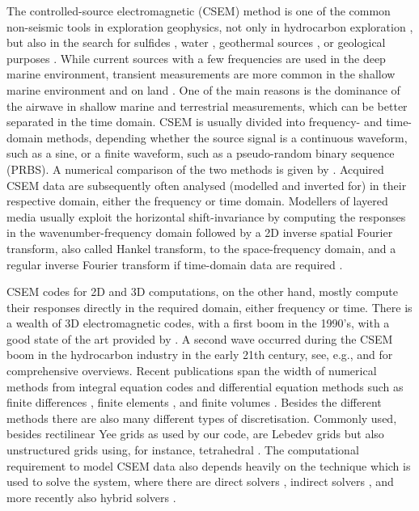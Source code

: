 \documentclass[
    manuscript,
    revised,
  ]{geophysics}
\begin{document}
The controlled-source electromagnetic (CSEM) method is one of the common
non-seismic tools in exploration geophysics, not only in hydrocarbon
exploration \citep{GEO.10.Constable}, but also in the search for sulfides
\citep{GRL.19.Gehrmann}, water \citep{GEO.05.Pedersen}, geothermal sources
\citep{WGC.15.Girard}, or geological purposes \citep{NAT.19.Johanson}. While
current sources with a few frequencies are used in the deep marine environment,
transient measurements are more common in the shallow marine environment and on
land \citep[e.g., ][]{GEO.07.Ziolkowski, SEG.07.Andreis, SEG.07.Avdeeva}. One
of the main reasons is the dominance of the airwave in shallow marine and
terrestrial measurements, which can be better separated in the time domain.
CSEM is usually divided into frequency- and time-domain methods, depending
whether the source signal is a continuous waveform, such as a sine, or a finite
waveform, such as a pseudo-random binary sequence (PRBS). A numerical
comparison of the two methods is given by \cite{GP.13.Conell}. Acquired CSEM
data are subsequently often analysed (modelled and inverted for) in their
respective domain, either the frequency or time domain. Modellers of layered
media usually exploit the horizontal shift-invariance by computing the
responses in the wavenumber-frequency domain followed by a 2D inverse spatial
Fourier transform, also called Hankel transform, to the space-frequency domain,
and a regular inverse Fourier transform if time-domain data are required
\citep[e.g., ][]{GEO.15.Hunziker}.

CSEM codes for 2D and 3D computations, on the other hand, mostly compute their
responses directly in the required domain, either frequency or time. There is a
wealth of 3D electromagnetic codes, with a first boom in the 1990's, with a
good state of the art provided by \cite{B.SEG.99.Oristaglio}. A second wave
occurred during the CSEM boom in the hydrocarbon industry in the early 21th
century, see, e.g., \cite{SG.05.Avdeev} and \cite{SG.10.Borner} for
comprehensive overviews. Recent publications span the width of numerical
methods from integral equation codes \citep{MGS.17.Kruglyakov} and differential
equation methods such as finite differences \citep{CAG.13.Sommer}, finite
elements \citep{GJI.13.Grayver}, and finite volumes \citep{GEO.14.Jahandari}.
Besides the different methods there are also many different types of
discretisation. Commonly used, besides rectilinear Yee grids
\citep{IEEE.66.Yee} as used by our code, are Lebedev grids
\citep{CMMP.64.Lebedev} but also unstructured grids using, for instance,
tetrahedral \citep{CAG.17.Cai}. The computational requirement to model CSEM
data also depends heavily on the technique which is used to solve the system,
where there are direct solvers \citep{GEO.15.Grayver}, indirect solvers
\citep{GJI.15.Jaysaval}, and more recently also hybrid solvers
\citep{GEO.18.Liu}.
\end{document}
